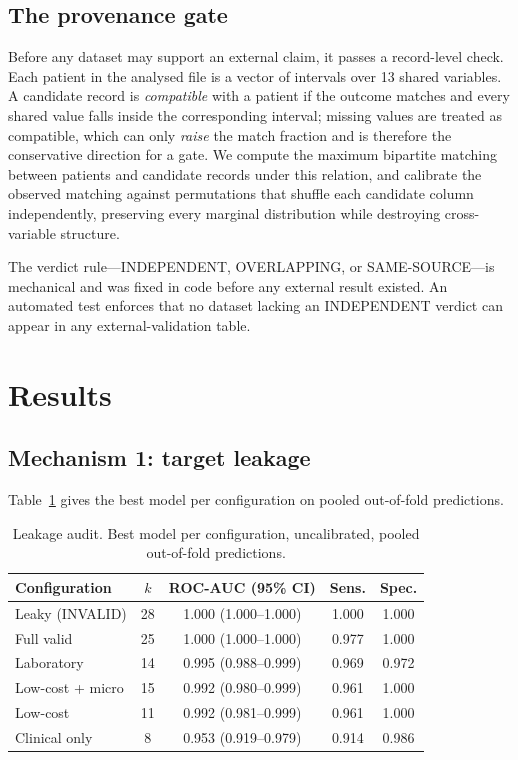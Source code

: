 \documentclass[conference]{IEEEtran}
\newcommand{\tabhead}[1]{\textbf{#1}}
\begin{document}
\subsection{The provenance gate}
\label{sec:gate}

Before any dataset may support an external claim, it passes a record-level
check. Each patient in the analysed file is a vector of intervals over 13
shared variables. A candidate record is \emph{compatible} with a patient if
the outcome matches and every shared value falls inside the corresponding
interval; missing values are treated as compatible, which can only
\emph{raise} the match fraction and is therefore the conservative direction
for a gate. We compute the maximum bipartite matching between patients and
candidate records under this relation, and calibrate the observed matching
against permutations that shuffle each candidate column independently,
preserving every marginal distribution while destroying cross-variable
structure.

The verdict rule---INDEPENDENT, OVERLAPPING, or SAME-SOURCE---is mechanical
and was fixed in code before any external result existed. An automated test
enforces that no dataset lacking an INDEPENDENT verdict can appear in any
external-validation table.

\section{Results}

\subsection{Mechanism 1: target leakage}

Table~\ref{tab:audit} gives the best model per configuration on pooled
out-of-fold predictions.

\begin{table}[t]
\caption{Leakage audit. Best model per configuration, uncalibrated,
pooled out-of-fold predictions.}
\label{tab:audit}
\centering
\footnotesize
\setlength{\tabcolsep}{3.5pt}
\begin{tabular}{lcccc}
\toprule
\tabhead{Configuration} & \tabhead{$k$} & \tabhead{ROC-AUC (95\% CI)} &
\tabhead{Sens.} & \tabhead{Spec.} \\
\midrule
Leaky (INVALID) & 28 & 1.000 (1.000--1.000) & 1.000 & 1.000 \\
Full valid      & 25 & 1.000 (1.000--1.000) & 0.977 & 1.000 \\
Laboratory      & 14 & 0.995 (0.988--0.999) & 0.969 & 0.972 \\
Low-cost + micro& 15 & 0.992 (0.980--0.999) & 0.961 & 1.000 \\
Low-cost        & 11 & 0.992 (0.981--0.999) & 0.961 & 1.000 \\
Clinical only   &  8 & 0.953 (0.919--0.979) & 0.914 & 0.986 \\
\bottomrule
\end{tabular}
\end{table}
\end{document}
